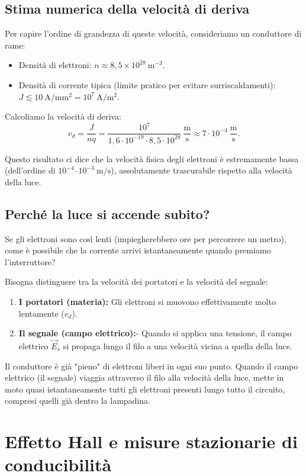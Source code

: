 \documentclass{book}
\begin{document}
\subsection*{Stima numerica della velocità di deriva}
Per capire l'ordine di grandezza di queste velocità, consideriamo un conduttore di rame:
\begin{itemize}
    \item Densità di elettroni: \(n\approx 8{,}5\times10^{28}\ \mathrm{m}^{-3}\).
    \item Densità di corrente tipica (limite pratico per evitare surriscaldamenti): \(J\lesssim 10\ \mathrm{A/mm^2} = 10^7\ \mathrm{A/m^2}\).
\end{itemize}

Calcoliamo la velocità di deriva:
\[
v_d = \frac{J}{nq} = \frac{10^7}{1{,}6\cdot10^{-19}\cdot 8{,}5\cdot10^{28}}\ \frac{\mathrm{m}}{\mathrm{s}} \approx 7\cdot10^{-4}\ \frac{\mathrm{m}}{\mathrm{s}}.
\]

Questo risultato ci dice che la velocità fisica degli elettroni è estremamente bassa (dell'ordine di \(10^{-4}\)–\(10^{-3}\ \mathrm{m/s}\)), assolutamente trascurabile rispetto alla velocità della luce.


\subsection*{Perché la luce si accende subito?}
Se gli elettroni sono così lenti (impiegherebbero ore per percorrere un metro), come è possibile che la corrente arrivi istantaneamente quando premiamo l'interruttore?

Bisogna distinguere tra la velocità dei portatori e la velocità del segnale:
\begin{enumerate}
    \item \textbf{I portatori (materia):} Gli elettroni si muovono effettivamente molto lentamente (\(v_d\)).
    \item \textbf{Il segnale (campo elettrico):}- Quando si applica una tensione, il campo elettrico \(\vec{E}_s\) si propaga lungo il filo a una velocità vicina a quella della luce.
\end{enumerate}
Il conduttore è già "pieno" di elettroni liberi in ogni suo punto. Quando il campo elettrico (il segnale) viaggia attraverso il filo alla velocità della luce, mette in moto quasi istantaneamente tutti gli elettroni presenti lungo tutto il circuito, compresi quelli già dentro la lampadina.



\section{Effetto Hall e misure stazionarie di conducibilità}
\end{document}
